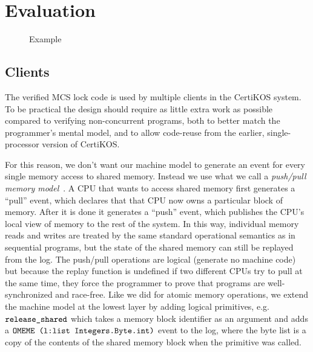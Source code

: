 
\section{Evaluation}
\label{sec:evaluation}

\begin{figure}
\begin{minipage}{\linewidth}
\noindent
\begin{multicols}{2}


\end{multicols}
\end{minipage}
\caption{ Example}
\label{fig:chapter:mcslock:palloc-example}
\end{figure}

\subsection{Clients}

The verified MCS lock code is used by multiple clients in the CertiKOS
system. To be practical the design should require as little extra work
as possible compared to verifying non-concurrent programs, both to
better match the programmer's mental model, and to allow code-reuse
from the earlier, single-processor version of CertiKOS.

For this reason, we don't want our machine model to generate an event
for every single memory access to shared memory. Instead we use what
we call a \emph{push/pull memory model}~\cite{certikos:osdi16, concurrency}. A
CPU that wants to access shared memory first generates a ``pull''
event, which declares that that CPU now owns a particular block of
memory. After it is done it generates a ``push'' event, which
publishes the CPU's local view of memory to the rest of the system. In
this way, individual memory reads and writes are treated by the same
standard operational semantics as in sequential programs, but the
state of the shared memory can still be replayed from the log.  The
push/pull operations are logical (generate no machine code) but
because the replay function is undefined if two different CPUs try to
pull at the same time, they force the programmer to prove that
programs are well-synchronized and race-free. Like we did for atomic
memory operations, we extend the machine model at the lowest layer by
adding logical primitives, e.g. ${\mathrm{\texttt{release\_shared}}}$ which takes a
memory block identifier as an argument and adds a
${\mathrm{\texttt{OMEME (l:list Integers.Byte.int)}}}$ event to the log, where the byte list is a
copy of the contents of the shared memory block when the primitive was
called.

